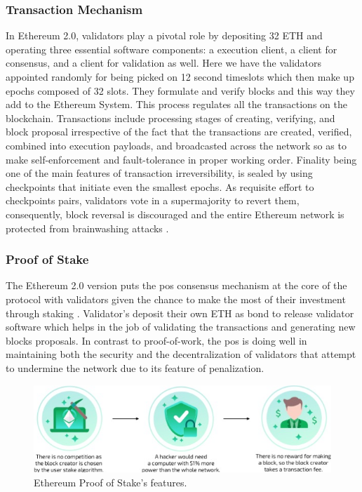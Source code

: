 \subsubsection{Transaction Mechanism}

In Ethereum 2.0, validators play a pivotal role by depositing 32 ETH and operating three essential software components: a execution client, a client for consensus, and a client for 
validation as well. Here we have the validators appointed randomly for being picked on 12 second timeslots which then make up epochs composed of 32 slots. They formulate 
and verify blocks and this way they add to the Ethereum System. This process regulates all the transactions on the blockchain. Transactions include processing stages of 
creating, verifying, and block proposal irrespective of the fact that the transactions are created, verified, combined into execution payloads, and broadcasted across 
the network so as to make self-enforcement and fault-tolerance in proper working order. Finality being one of the main features of transaction irreversibility, is 
sealed by using checkpoints that initiate even the smallest epochs. As requisite effort to checkpoints pairs, validators vote in a supermajority to revert them, 
consequently, block reversal is discouraged and the entire Ethereum network is protected from brainwashing attacks \cite{ethereumpos}.

\subsubsection{Proof of Stake}

The Ethereum 2.0 version puts the \gls{pos} consensus mechanism at the core of the protocol with validators given the chance to make the most of their 
investment through staking \cite{ethereumpos}. Validator's deposit their own ETH as bond to release validator software which helps in the job of validating the transactions and 
generating new blocks proposals. In contrast to proof-of-work, the \gls{pos} is doing well in maintaining both the security and the decentralization of validators that 
attempt to undermine the network due to its feature of penalization.

\begin{figure}[h]  
  \centering
  \includegraphics[width=1\textwidth]{Images/Cattura.PNG} 
  \caption{Ethereum Proof of Stake's features.}
\end{figure}

